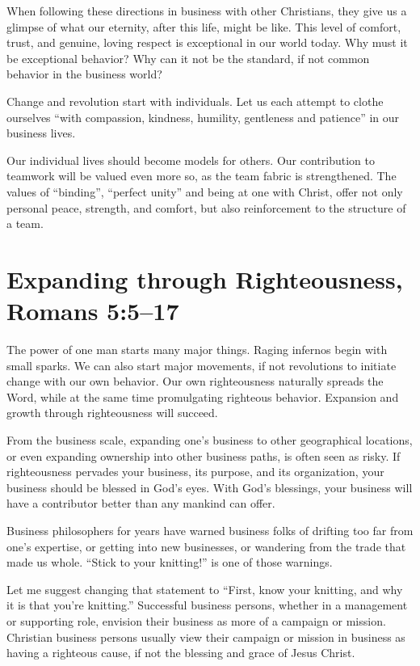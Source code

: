 \documentclass[12pt]{memoir}
\begin{document}
When following these directions in business with other Christians,
they give us a glimpse of what our eternity, after this life, might
be like. This level of comfort, trust, and genuine, loving respect
is exceptional in our world today. Why must it be exceptional behavior?
Why can it not be the standard, if not common behavior in the business
world?

Change and revolution start with individuals. Let us each attempt
to clothe ourselves ``with compassion, kindness, humility,
gentleness and patience'' in our business lives.

Our individual lives should become models for others. Our contribution
to teamwork will be valued even more so, as the team fabric is strengthened.
The values of ``binding'', ``perfect unity'' and being at one
with Christ, offer not only personal peace, strength, and comfort,
but also reinforcement to the structure of a team.

\section[Expanding through Righteousness]{Expanding through Righteousness, Romans 5:5--17}

The power of one man starts many major things. Raging infernos begin
with small sparks. We can also start major movements, if not revolutions
to initiate change with our own behavior. Our own righteousness naturally
spreads the Word, while at the same time promulgating righteous
behavior. Expansion and growth through righteousness will succeed.

From the business scale, expanding one's business to other geographical
locations, or even expanding ownership into other business paths,
is often seen as risky. If righteousness pervades your business, its
purpose, and its organization, your business should be blessed in God's
eyes. With God's blessings, your business will have a contributor
better than any mankind can offer.

Business philosophers for years have warned business folks of drifting
too far from one's expertise, or getting into new businesses, or wandering
from the trade that made us whole. ``Stick to your knitting!'' is
one of those warnings.

Let me suggest changing that statement to ``First, know your knitting, and why it is that you're knitting.'' Successful business persons, whether in a management or supporting role, envision their business as more of a campaign or mission.
Christian business persons usually view their campaign or mission in business as having a righteous cause, if not the blessing and grace of Jesus Christ.
\end{document}
